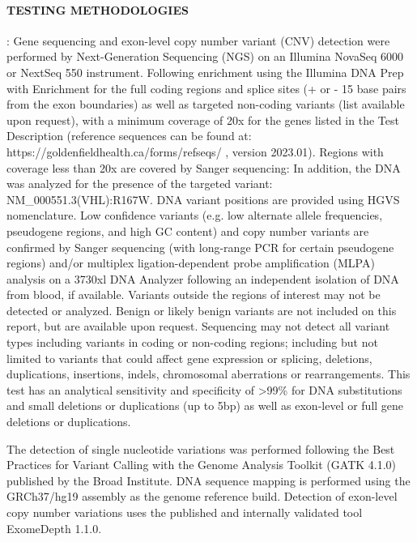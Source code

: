 \documentclass[10pt]{extarticle}
\begin{document}
\paragraph{TESTING METHODOLOGIES}: Gene sequencing and exon-level copy number variant (CNV) detection were performed by Next-Generation Sequencing (NGS) on an Illumina NovaSeq 6000 or NextSeq 550 instrument. Following enrichment using the Illumina DNA Prep with Enrichment for the full coding regions and splice sites (+ or - 15 base pairs from the exon boundaries) as well as targeted non-coding variants (list available upon request), with a minimum coverage of 20x for the genes listed in the Test Description (reference sequences can be found at: https://goldenfieldhealth.ca/forms/refseqs/ , version 2023.01). Regions with coverage less than 20x are covered by Sanger sequencing: In addition, the DNA was analyzed for the presence of the targeted variant: NM\_000551.3(VHL):R167W. DNA variant positions are provided using HGVS nomenclature. Low confidence variants (e.g. low alternate allele frequencies, pseudogene regions, and high GC content) and copy number variants are confirmed by Sanger sequencing (with long-range PCR for certain pseudogene regions) and/or multiplex ligation-dependent probe amplification (MLPA) analysis on a 3730xl DNA Analyzer following an independent isolation of DNA from blood, if available. Variants outside the regions of interest may not be detected or analyzed. Benign or likely benign variants are not included on this report, but are available upon request. Sequencing may not detect all variant types including variants in coding or non-coding regions; including but not limited to variants that could affect gene expression or splicing, deletions, duplications, insertions, indels, chromosomal aberrations or rearrangements. This test has an analytical sensitivity and specificity of >99\% for DNA substitutions and small deletions or duplications (up to 5bp) as well as exon-level or full gene deletions or duplications.

The detection of single nucleotide variations was performed following the Best Practices for Variant Calling with the Genome Analysis Toolkit (GATK 4.1.0) published by the Broad Institute. DNA sequence mapping is performed using the GRCh37/hg19 assembly as the genome reference build. Detection of exon-level copy number variations uses the published and internally validated tool ExomeDepth 1.1.0.
\end{document}
